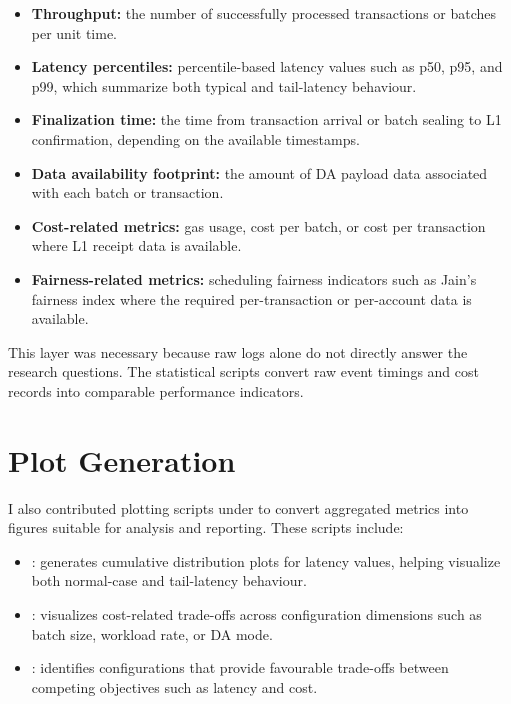 \begin{itemize}
    \item \textbf{Throughput:} the number of successfully processed transactions or batches per unit time.
    \item \textbf{Latency percentiles:} percentile-based latency values such as p50, p95, and p99, which summarize both typical and tail-latency behaviour.
    \item \textbf{Finalization time:} the time from transaction arrival or batch sealing to L1 confirmation, depending on the available timestamps.
    \item \textbf{Data availability footprint:} the amount of DA payload data associated with each batch or transaction.
    \item \textbf{Cost-related metrics:} gas usage, cost per batch, or cost per transaction where L1 receipt data is available.
    \item \textbf{Fairness-related metrics:} scheduling fairness indicators such as Jain's fairness index where the required per-transaction or per-account data is available.
\end{itemize}

This layer was necessary because raw logs alone do not directly answer the research questions. The statistical scripts convert raw event timings and cost records into comparable performance indicators.

\section{Plot Generation}

I also contributed plotting scripts under  to convert aggregated metrics into figures suitable for analysis and reporting. These scripts include:

\begin{itemize}
    \item {}: generates cumulative distribution plots for latency values, helping visualize both normal-case and tail-latency behaviour.
    \item {}: visualizes cost-related trade-offs across configuration dimensions such as batch size, workload rate, or DA mode.
    \item {}: identifies configurations that provide favourable trade-offs between competing objectives such as latency and cost.
\end{itemize}

